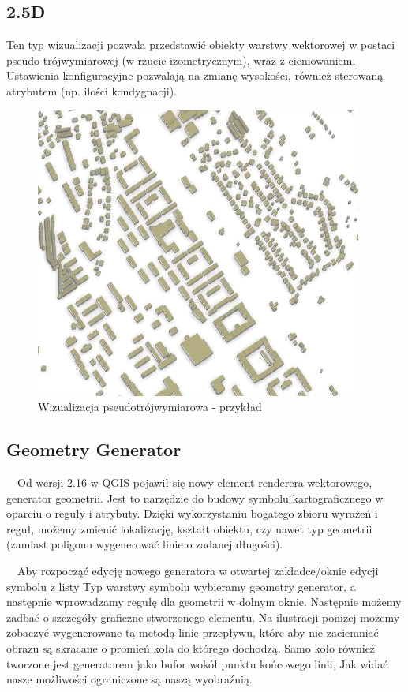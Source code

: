 \documentclass[12pt,a4paper]{book}
\begin{document}
\subsection[2.5D]{2.5D}
Ten typ wizualizacji pozwala przedstawić obiekty warstwy wektorowej w postaci pseudo trójwymiarowej (w rzucie izometrycznym), wraz z cieniowaniem. Ustawienia konfiguracyjne pozwalają na zmianę wysokości, również sterowaną atrybutem (np. ilości kondygnacji).

\begin{center}
\begin{figure}
\includegraphics[width=10.746cm,height=9.581cm]{007-25d.png}
\caption{Wizualizacja pseudotrójwymiarowa - przykład}
\end{figure}
\end{center}

\subsection{Geometry Generator}
\ \ Od wersji 2.16 w QGIS pojawił się nowy element renderera wektorowego, generator geometrii. Jest to narzędzie do budowy symbolu kartograficznego w oparciu o reguły i atrybuty. Dzięki wykorzystaniu bogatego zbioru wyrażeń i reguł, możemy zmienić lokalizację, kształt obiektu, czy nawet typ geometrii (zamiast poligonu wygenerować linie o zadanej długości).

\ \ Aby rozpocząć edycję nowego generatora w otwartej zakładce/oknie edycji symbolu z listy Typ warstwy symbolu wybieramy geometry generator,  a następnie wprowadzamy regułę dla geometrii w dolnym oknie. Następnie możemy zadbać o szczegóły graficzne stworzonego elementu. Na ilustracji poniżej możemy zobaczyć wygenerowane tą metodą linie przepływu, które aby nie zaciemniać obrazu są skracane o promień koła do którego dochodzą. Samo koło również tworzone jest generatorem jako bufor wokół punktu końcowego linii, Jak widać nasze możliwości ograniczone są naszą wyobraźnią.
\end{document}
